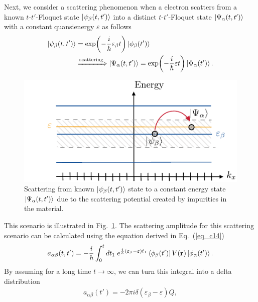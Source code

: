 Next, we consider a scattering phenomenon when a electron scatters from a known $t$-$t'$-Floquet state $\ket{\psi_{\beta}(t,t')} $ into a distinct $t$-$t'$-Floquet state $\ket{\Psi_{\alpha}(t,t')}$ with a constant quansienergy $\varepsilon$ as follows
\begin{equation} \label{eq_c15}
  \begin{aligned}
  \ket{\psi_{\beta}(t,t')} &= \exp(-\frac{i}{\hbar}\varepsilon_{\beta} t)
  \ket{\phi_{\beta}(t')} \\
  &
  \xRightarrow{\text{scattering}}
  \ket{\Psi_{\alpha}(t,t')} = \exp(-\frac{i}{\hbar}\varepsilon t)
  \ket{\Phi_{\alpha}(t')}.
  \end{aligned}
\end{equation}
\begin{figure}[b]
  \includegraphics[scale=1.0]{figures/fig_6.pdf}
  \caption{Scattering from known $\ket{\psi_{\beta}(t,t')}$ state to a constant energy state $\ket{\Psi_{\alpha}(t,t')}$ due to the scattering potential created by impurities in the material.}
  \label{fig_2}
\end{figure}
This scenario is illustrated in Fig.~\ref{fig_2}.
The scattering amplitude for this scattering scenario can be calculated using the equation derived in Eq.~(\ref{eq_c14})
\begin{equation} \label{eq_c16}
  \begin{aligned}
    a_{\alpha\beta}(t,t') =
    -\frac{i}{\hbar}
    \int_{0}^t dt_1 \;
    e^{\frac{i}{\hbar}\qty(\varepsilon_{\beta} - \varepsilon)t_1}
    \bra{\phi_{\beta}(t')}
    V(\vb{r}) \ket{\phi_{\alpha}(t')}.
  \end{aligned}
\end{equation}
By assuming for a long time $t \rightarrow \infty$, we can turn this integral into a delta distribution
\begin{equation} \label{eq_c17}
  \begin{aligned}
    a_{\alpha\beta}(t') =
    -2\pi i \delta(\varepsilon_{\beta} - \varepsilon)Q,
  \end{aligned}
\end{equation}
